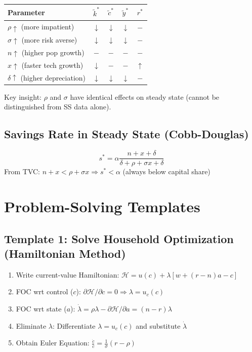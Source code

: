 \documentclass[a4paper,11pt]{article}
\newcommand{\ktilde}{\tilde{k}}
\newcommand{\ytilde}{\tilde{y}}
\newcommand{\ctilde}{\tilde{c}}
\begin{document}
\begin{center}
\begin{tabular}{lcccc}
\toprule
Parameter & $\ktilde^*$ & $\ctilde^*$ & $\ytilde^*$ & $r^*$ \\
\midrule
$\rho \uparrow$ (more impatient) & $\downarrow$ & $\downarrow$ & $\downarrow$ & $-$ \\
$\sigma \uparrow$ (more risk averse) & $\downarrow$ & $\downarrow$ & $\downarrow$ & $-$ \\
$n \uparrow$ (higher pop growth) & $-$ & $-$ & $-$ & $-$ \\
$x \uparrow$ (faster tech growth) & $\downarrow$ & $-$ & $-$ & $\uparrow$ \\
$\delta \uparrow$ (higher depreciation) & $\downarrow$ & $\downarrow$ & $\downarrow$ & $-$ \\
\bottomrule
\end{tabular}
\end{center}

Key insight: $\rho$ and $\sigma$ have identical effects on steady state (cannot be distinguished from SS data alone).

\subsection*{Savings Rate in Steady State (Cobb-Douglas)}
\[
s^* = \alpha \frac{n + x + \delta}{\delta + \rho + \sigma x + \delta}
\]
From TVC: $n + x < \rho + \sigma x \Rightarrow s^* < \alpha$ (always below capital share)

\clearpage

\section*{Problem-Solving Templates}

\subsection*{Template 1: Solve Household Optimization (Hamiltonian Method)}
\begin{enumerate}
    \item Write current-value Hamiltonian: $\mathcal{H} = u(c) + \lambda [w + (r-n)a - c]$
    \item FOC wrt control ($c$): $\partial\mathcal{H}/\partial c = 0 \Rightarrow \lambda = u_c(c)$
    \item FOC wrt state ($a$): $\dot{\lambda} = \rho\lambda - \partial\mathcal{H}/\partial a = (n - r)\lambda$
    \item Eliminate $\lambda$: Differentiate $\lambda = u_c(c)$ and substitute $\dot{\lambda}$
    \item Obtain Euler Equation: $\frac{\dot{c}}{c} = \frac{1}{\sigma}(r - \rho)$
\end{enumerate}
\end{document}
